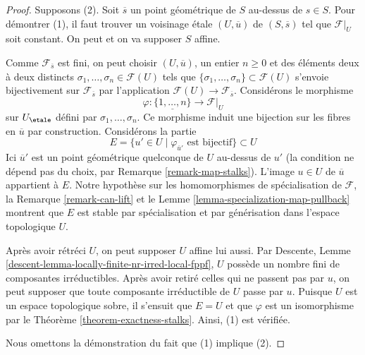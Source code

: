 \begin{proof}
Supposons (2). Soit $\overline{s}$ un point géométrique de $S$ au-dessus de
$s \in S$. Pour démontrer (1), il faut trouver un voisinage étale
$(U, \overline{u})$ de $(S, \overline{s})$ tel que $\mathcal{F}|_U$
soit constant. On peut et on va supposer $S$ affine.

\medskip\noindent
Comme $\mathcal{F}_{\overline{s}}$ est fini, on peut choisir
$(U, \overline{u})$, un entier $n \geq 0$ et des éléments deux à deux distincts
$\sigma_1, \ldots, \sigma_n \in \mathcal{F}(U)$
tels que $\{\sigma_1, \ldots, \sigma_n\} \subset \mathcal{F}(U)$ s'envoie
bijectivement sur $\mathcal{F}_{\overline{s}}$ par l'application
$\mathcal{F}(U) \to \mathcal{F}_{\overline{s}}$.
Considérons le morphisme
$$
\varphi : \underline{\{1, \ldots, n\}} \longrightarrow \mathcal{F}|_U
$$
sur $U_\etale$ défini par $\sigma_1, \ldots, \sigma_n$.
Ce morphisme induit une bijection sur les fibres en $\overline{u}$
par construction. Considérons la partie
$$
E = \{u' \in U \mid \varphi_{\overline{u}'}\text{ est bijectif}\} \subset U
$$
Ici $\overline{u}'$ est un point géométrique quelconque de $U$ au-dessus de $u'$
(la condition ne dépend pas du choix, par Remarque \ref{remark-map-stalks}).
L'image $u \in U$ de $\overline{u}$ appartient à $E$.
Notre hypothèse sur les homomorphismes de spécialisation de $\mathcal{F}$,
la Remarque \ref{remark-can-lift} et le
Lemme \ref{lemma-specialization-map-pullback}
montrent que $E$ est stable par spécialisation
et par générisation dans l'espace topologique $U$.

\medskip\noindent
Après avoir rétréci $U$, on peut supposer $U$ affine lui aussi. Par
Descente, Lemme \ref{descent-lemma-locally-finite-nr-irred-local-fppf},
$U$ possède un nombre fini de composantes irréductibles.
Après avoir retiré celles qui ne passent pas
par $u$, on peut supposer que toute composante irréductible de $U$
passe par $u$. Puisque $U$ est un espace topologique sobre,
il s'ensuit que $E = U$ et que $\varphi$ est un isomorphisme par le
Théorème \ref{theorem-exactness-stalks}. Ainsi, (1) est vérifiée.

\medskip\noindent
Nous omettons la démonstration du fait que (1) implique (2).
\end{proof}

